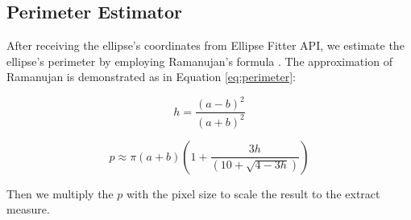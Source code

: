 \subsection{Perimeter Estimator}
\noindent
	
	After receiving the ellipse's coordinates from Ellipse Fitter API, we estimate the ellipse's perimeter by employing Ramanujan’s formula \cite{perimeter}. The approximation of Ramanujan is demonstrated as in Equation \eqref{eq:perimeter}:
	
	\[ h = \frac{(a-b)^2}{(a+b)^2} \]
	
	\[ p \approx \pi (a+b) (1 + \frac{3h}{(10 + \sqrt{4 - 3h})} ) \label{eq:perimeter} \]

\noindent
	Then we multiply the $p$ with the pixel size to scale the result to the extract measure.

		
	
	
